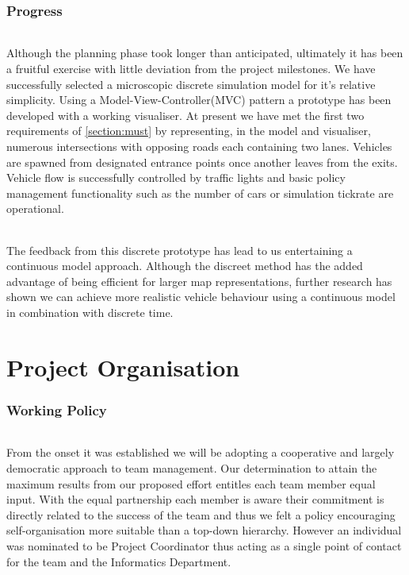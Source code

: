 \documentclass[11pt,a4paper]{article}
\begin{document}
\section{Progress}
\paragraph{}
Although the planning phase took longer than anticipated, ultimately it has been a fruitful exercise with little deviation from the project milestones.  We have successfully selected a microscopic discrete simulation model for it's relative simplicity.  Using a Model-View-Controller(MVC) pattern a prototype has been developed with a working visualiser.  At present we have met the first two requirements of \ref{section:must} by representing, in the model and visualiser, numerous intersections with opposing roads each containing two lanes.  Vehicles are spawned from designated entrance points once another leaves from the exits.  Vehicle flow is successfully controlled by traffic lights and basic policy management functionality such as the number of cars or simulation tickrate are operational. 
\paragraph{}
The feedback from this discrete prototype has lead to us entertaining a continuous model approach.  Although the discreet method has the added advantage of being efficient for larger map representations, further research has shown we can achieve more realistic vehicle behaviour using a continuous model in combination with discrete time.

\pagebreak

\part{Project Organisation}

\section{Working Policy}
\paragraph{}
From the onset it was established we will be adopting a cooperative and largely democratic approach to team management.  Our determination to attain the maximum results from our proposed effort entitles each team member equal input.  With the equal partnership each member is aware their commitment is directly related to the success of the team and thus we felt a policy encouraging self-organisation more suitable than a top-down hierarchy.  However an individual was nominated to be Project Coordinator thus acting as a single point of contact for the team and the Informatics Department.
\end{document}
